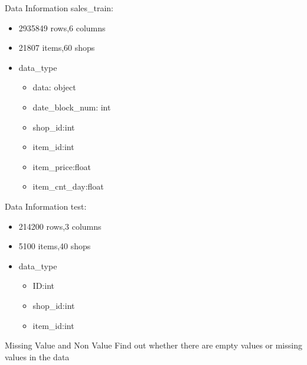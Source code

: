 \documentclass[
 size=14pt,
 paper=smartboard,  %
 mode=present, 		%
 display=slides, 	%
 style=tuliplab,  	%
 pauseslide,
 fleqn,leqno]{powerdot}
\begin{document}
\begin{slide}[toc=,bm=]{Data Information}
  sales_train:\par
    \begin{itemize}
      \item 2935849 rows,6 columns
      \item 21807 items,60 shops
      \item data_type
            \begin{itemize}
              \item data: object
              \item date_block_num: int
              \item shop_id:int
              \item item_id:int
              \item item_price:float
              \item item_cnt_day:float
            \end{itemize}
    \end{itemize}
\end{slide}


\begin{slide}[toc=,bm=]{Data Information}
  test:\par
    \begin{itemize}
      \item 214200 rows,3 columns
      \item 5100 items,40 shops
      \item data_type
            \begin{itemize}
              \item ID:int
              \item shop_id:int
              \item item_id:int
            \end{itemize}
    \end{itemize}
\end{slide}


\begin{slide}[toc=,bm=]{Missing Value and Non Value}
  Find out whether there are empty values or missing values in the data
\end{slide}
\end{document}
